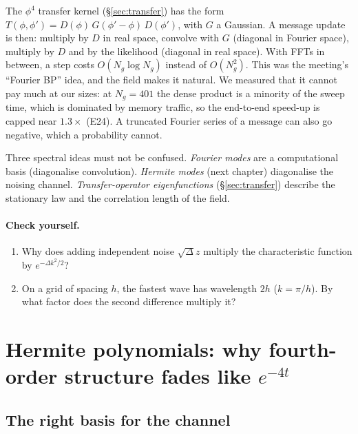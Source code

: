 The $\phi^4$ transfer kernel (\S\ref{sec:transfer}) has the form $T(\phi,\phi')=D(\phi)\,G(\phi'-\phi)\,D(\phi')$, with $G$ a
Gaussian. A message update is then: multiply by $D$ in real space, convolve with $G$ (diagonal in Fourier
space), multiply by $D$ and by the likelihood (diagonal in real space). With FFTs in between, a step costs
$O(N_g\log N_g)$ instead of $O(N_g^2)$. This was the meeting's ``Fourier BP'' idea, and the field makes it natural.
We measured that it cannot pay much at our sizes: at $N_g=401$ the dense product is a minority of the sweep
time, which is dominated by memory traffic, so the end-to-end speed-up is capped near $1.3\times$ (E24). A
truncated Fourier series of a message can also go negative, which a probability cannot.

\begin{caution}
Three spectral ideas must not be confused. \emph{Fourier modes} are a computational basis (diagonalise
convolution). \emph{Hermite modes} (next chapter) diagonalise the noising channel. \emph{Transfer-operator
eigenfunctions} (\S\ref{sec:transfer}) describe the stationary law and the correlation length of the field.
\end{caution}

\paragraph{Check yourself.}
\begin{enumerate}[label=\thesection.\arabic*,leftmargin=2.2em]
\item Why does adding independent noise $\sqrt\Delta z$ multiply the characteristic function by $e^{-\Delta k^2/2}$?
\item On a grid of spacing $h$, the fastest wave has wavelength $2h$ ($k=\pi/h$). By what factor does the second
  difference multiply it?
\end{enumerate}

\section{Hermite polynomials: why fourth-order structure fades like $e^{-4t}$}\label{sec:hermite}

\subsection{The right basis for the channel}

